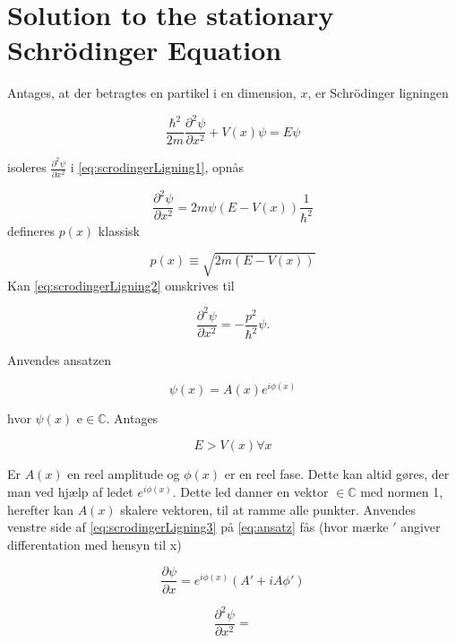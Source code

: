 \section{Solution to the stationary Schrödinger Equation}
Antages, at der betragtes en partikel i en dimension, $x$,  er Schrödinger ligningen

\begin{equation}
    \frac{\hbar^2}{2m}\frac{\partial^2 \psi}{\partial x^2} + V(x) \psi = E \psi
    \label{eq:scrodingerLigning1}
\end{equation}

isoleres $\frac{\partial^2 \psi}{\partial x^2}$ i \cref{eq:scrodingerLigning1}, opnås

\begin{equation}
    \frac{\partial^2 \psi}{\partial x^2} = 2m\psi (E  - V(x)) \frac{1}{\hbar^2}
    \label{eq:scrodingerLigning2}

\end{equation}
defineres $p(x)$ klassisk

\begin{equation}
p(x) \equiv \sqrt{2m(E-V(x))}

\end{equation}
Kan \cref{eq:scrodingerLigning2} omskrives til

\begin{equation}
    \frac{\partial^2 \psi}{\partial x^2} = - \frac{p^2}{\hbar^2} \psi.
    \label{eq:scrodingerLigning3}
\end{equation}

Anvendes ansatzen

\begin{equation}
    \psi(x) = A(x) e^{i \phi(x)}
    \label{eq:ansatz}
\end{equation}

hvor $\psi (x)$ e$ \in \mathbb{C}$. Antages

\begin{equation}
 E > V(x) \forall x
\end{equation}

Er $A(x)$ en reel amplitude og $\phi(x)$ er en reel fase. Dette kan altid gøres, der man ved hjælp af ledet  $e^{i \phi(x)} $. Dette led danner en vektor $ \in \mathbb{C}$ med normen 1, herefter kan $A(x)$  skalere vektoren, til at ramme alle punkter. Anvendes venstre side af \cref{eq:scrodingerLigning3} på \cref{eq:ansatz} fås (hvor mærke $'$ angiver differentation med hensyn til x)

\begin{equation}
    \frac{\partial \psi}{\partial x} = e^{i \phi(x)}(A' + iA\phi ')
    \label{eq:diff1gange}
\end{equation}

\begin{equation}
    \frac{\partial^2 \psi}{\partial x^2} =
    \label{eq:diff2gange}
\end{equation}
